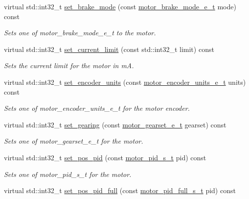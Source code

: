 \begin{DoxyCompactItemize}
virtual std\+::int32\+\_\+t \mbox{\hyperlink{classpros_1_1Motor_ab51969169dc534537f79710261daa3dd}{set\+\_\+brake\+\_\+mode}} (const \mbox{\hyperlink{motors_8h_aa324a2881696428c9e3684f9ad23a83b}{motor\+\_\+brake\+\_\+mode\+\_\+e\+\_\+t}} mode) const
\begin{DoxyCompactList}\small\item\em Sets one of motor\+\_\+brake\+\_\+mode\+\_\+e\+\_\+t to the motor. \end{DoxyCompactList}\item 
virtual std\+::int32\+\_\+t \mbox{\hyperlink{classpros_1_1Motor_a4c496dfb0b33f989d7329a61b7b6d6ba}{set\+\_\+current\+\_\+limit}} (const std\+::int32\+\_\+t limit) const
\begin{DoxyCompactList}\small\item\em Sets the current limit for the motor in mA. \end{DoxyCompactList}\item 
virtual std\+::int32\+\_\+t \mbox{\hyperlink{classpros_1_1Motor_a2d2fea8d5967d1e41471111aa89afd84}{set\+\_\+encoder\+\_\+units}} (const \mbox{\hyperlink{motors_8h_a6677ba23760c558fd8b7b4e1e00a6123}{motor\+\_\+encoder\+\_\+units\+\_\+e\+\_\+t}} units) const
\begin{DoxyCompactList}\small\item\em Sets one of motor\+\_\+encoder\+\_\+units\+\_\+e\+\_\+t for the motor encoder. \end{DoxyCompactList}\item 
virtual std\+::int32\+\_\+t \mbox{\hyperlink{classpros_1_1Motor_a3adf8b737ad2e4ebb5f000401c536fed}{set\+\_\+gearing}} (const \mbox{\hyperlink{motors_8h_aa2f1c305c998abc3bf8dd1f76fa4da8b}{motor\+\_\+gearset\+\_\+e\+\_\+t}} gearset) const
\begin{DoxyCompactList}\small\item\em Sets one of motor\+\_\+gearset\+\_\+e\+\_\+t for the motor. \end{DoxyCompactList}\item 
virtual std\+::int32\+\_\+t \mbox{\hyperlink{classpros_1_1Motor_a7a42563b94124faebb50e5731d5664ad}{set\+\_\+pos\+\_\+pid}} (const \mbox{\hyperlink{motors_8h_ad2e907c8d7ce53c1fd91f1b9801072e3}{motor\+\_\+pid\+\_\+s\+\_\+t}} pid) const
\begin{DoxyCompactList}\small\item\em Sets one of motor\+\_\+pid\+\_\+s\+\_\+t for the motor. \end{DoxyCompactList}\item 
virtual std\+::int32\+\_\+t \mbox{\hyperlink{classpros_1_1Motor_a67cff0666b34c3731e21e856414c2066}{set\+\_\+pos\+\_\+pid\+\_\+full}} (const \mbox{\hyperlink{motors_8h_a0295cbf49f5c70c17b5fa962bd25febd}{motor\+\_\+pid\+\_\+full\+\_\+s\+\_\+t}} pid) const

\end{DoxyCompactItemize}
